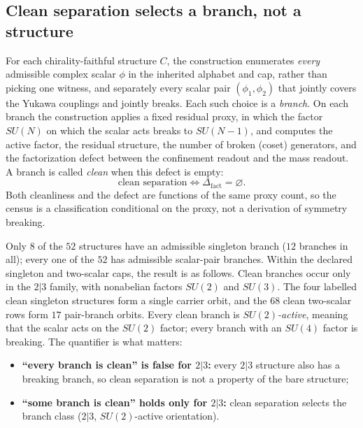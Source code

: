 \documentclass[11pt]{article}
\newcommand{\Deltafact}{\Delta_{\mathrm{fact}}}
\theoremstyle{definition}
\providecommand{\tightlist}{\setlength{\itemsep}{0pt}\setlength{\parskip}{0pt}}
\begin{document}
\subsection{Clean separation selects a branch, not a structure}\label{conditional-selection-of-mathfraksu2oplusmathfraksu3oplusmathfraku1}

For each chirality-faithful structure \(C\), the construction enumerates \emph{every} admissible complex scalar
\(\phi\) in the inherited alphabet and cap, rather than picking one witness, and separately every scalar pair
\((\phi_1,\phi_2)\) that jointly covers the Yukawa couplings and jointly breaks. Each such choice is a \emph{branch}.
On each branch the construction applies a fixed residual proxy, in which the factor \(SU(N)\) on which the scalar acts
breaks to \(SU(N-1)\), and computes the active factor, the residual structure, the number of broken (coset)
generators, and the factorization defect between the confinement readout and the mass readout. A branch is called
\emph{clean} when this defect is empty:
\[
\text{clean separation}\iff\Deltafact=\varnothing .
\]
Both cleanliness and the defect are functions of the same proxy count, so the census is a classification conditional
on the proxy, not a derivation of symmetry breaking.

Only \(8\) of the \(52\) structures have an admissible singleton branch (\(12\) branches in all); every one of the
\(52\) has admissible scalar-pair branches. Within the declared singleton and two-scalar caps, the result is as
follows. Clean branches occur only in the \(2|3\)
family, with nonabelian factors \(SU(2)\) and \(SU(3)\). The four labelled clean singleton structures form a single
carrier orbit, and the \(68\) clean two-scalar rows form \(17\) pair-branch orbits. Every clean branch is
\emph{\(SU(2)\)-active}, meaning that the scalar acts on the \(SU(2)\) factor; every branch with an \(SU(4)\) factor
is breaking. The quantifier is what matters:

\begin{itemize}\tightlist
\item \textbf{``every branch is clean'' is false for \(2|3\):} every \(2|3\) structure also has a breaking branch, so
  clean separation is not a property of the bare structure;
\item \textbf{``some branch is clean'' holds only for \(2|3\):} clean separation selects the branch class
  (\(2|3\), \(SU(2)\)-active orientation).
\end{itemize}
\end{document}

